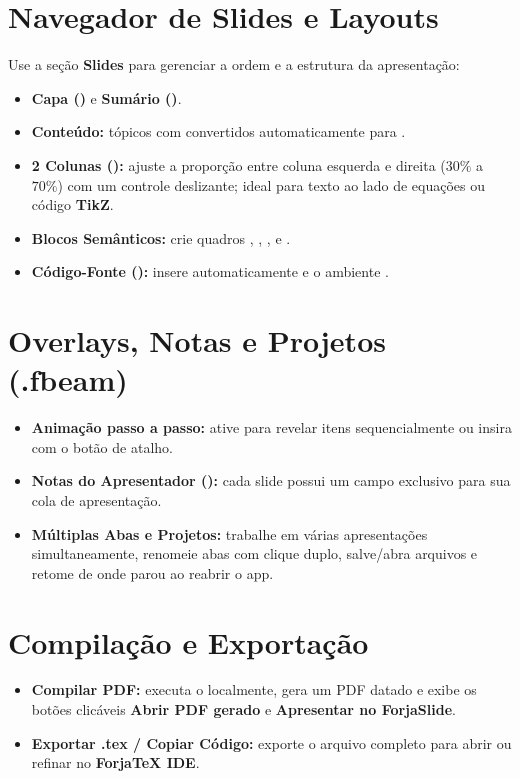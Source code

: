 \documentclass[11pt,a4paper]{article}
\begin{document}
\section{Navegador de Slides e Layouts}
Use a seção \textbf{Slides} para gerenciar a ordem e a estrutura da apresentação:
\begin{itemize}
  \item \textbf{Capa ()} e \textbf{Sumário ()}.
  \item \textbf{Conteúdo:} tópicos com \code{- } convertidos automaticamente para .
  \item \textbf{2 Colunas ():} ajuste a proporção entre coluna esquerda e direita ($30\%$ a $70\%$) com um controle deslizante; ideal para texto ao lado de equações ou código \textbf{TikZ}.
  \item \textbf{Blocos Semânticos:} crie quadros , , ,  e .
  \item \textbf{Código-Fonte ():} insere automaticamente \code{[fragile]} e o ambiente .
\end{itemize}

\section{Overlays, Notas e Projetos (.fbeam)}
\begin{itemize}
  \item \textbf{Animação passo a passo:} ative \code{[<+->]} para revelar itens sequencialmente ou insira  com o botão de atalho.
  \item \textbf{Notas do Apresentador ():} cada slide possui um campo exclusivo para sua cola de apresentação.
  \item \textbf{Múltiplas Abas e Projetos:} trabalhe em várias apresentações simultaneamente, renomeie abas com clique duplo, salve/abra arquivos  e retome de onde parou ao reabrir o app.
\end{itemize}

\section{Compilação e Exportação}
\begin{itemize}
  \item \textbf{Compilar PDF:} executa o  localmente, gera um PDF datado e exibe os botões clicáveis \textbf{Abrir PDF gerado} e \textbf{Apresentar no ForjaSlide}.
  \item \textbf{Exportar .tex / Copiar Código:} exporte o arquivo completo para abrir ou refinar no \textbf{ForjaTeX IDE}.
\end{itemize}
\end{document}
